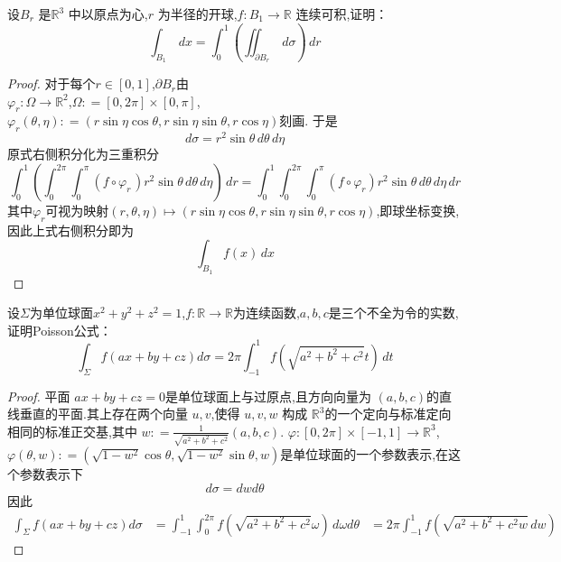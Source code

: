 \documentclass[lang=cn,12pt,color=green,fontset=none,thmcnt=section]{elegantbook}
\begin{document}
\begin{exercise}[]
设\(B_{r} \) 是\(\mathbb{R}^{3}\) 中以原点为心,\(r\) 为半径的开球,\(
    f:B_1 \to \mathbb{R}
\) 连续可积,证明： \[
    \int_{B_1} \,d{x} = \int_{0}^{1}\left( \iint_{\partial{B_{r}}} \,d{\sigma} \right)  \,d{r}
\]

\end{exercise}

\begin{proof}
  对于每个$r \in[0,1]$,$\partial B_{r}$由
  \\ $\varphi _{r}:\Omega\to
   \mathbb{R}^{2}$,$\Omega: =[0,2\pi]\times\left[ 0, \pi \right]$,$\varphi _{r}
   \left( \theta,\eta \right): = \left( r\sin\eta \cos\theta,r\sin \eta
   \sin\theta,r\cos \eta \right)$刻画. 于是 $$ d\sigma = r^{2}\sin\theta\, d\theta\,
   d \eta $$原式右侧积分化为三重积分 $$ \int _{0}^{1}\left( \int _{0}^{2\pi}\int
   _{0}^{\pi}\left( f\circ \varphi _{r\,} \right)r^{2} \sin\theta \,d\theta \,d
   \eta \right) \,dr = \int _{0}^{1}\int _{0}^{2\pi}\int _{0}^{\pi}\left( f\circ
   \varphi _{r} \right) r^{2}\sin\theta\,d\theta \,d \eta \,dr$$其中$\varphi
   _{r}$可视为映射$\left( r,\theta,\eta \right)\mapsto \left( r\sin \eta \cos\theta,
   r\sin \eta \sin \theta,r\cos \eta \right)$,即球坐标变换,因此上式右侧积分即为 $$ \int
   _{B_{1}}f\left( x \right) \,dx $$

\end{proof}

\begin{exercise}
设$\Sigma$为单位球面$x^{2}+y^{2}+z^{2}=1$,$f:\mathbb{R}\to \mathbb{R}$为连续函数,$a,b,
c$是三个不全为令的实数,证明Poisson公式： $$ \int _{\Sigma}f\left( ax+by+cz \right) d\sigma =
2\pi \int _{-1}^{1}f\left( \sqrt{ a^{2}+b^{2}+c^{2} } t\right) \,dt $$
    
\end{exercise}

\begin{proof}

平面 $ax+ by+ cz= 0 $是单位球面上与过原点,且方向向量为 $\left( a,b,c \right) $的直线垂直的平面.其上存在两个向量 $u ,v$,使得 $u,v,w$ 
构成 $ \mathbb{R}^{3}   $的一个定向与标准定向相同的标准正交基,其中 $ w : = \frac{1}{ \sqrt{ a^{2}+ b^{2}+ c^{2}}}\left( a,b,c \right) $.
$\varphi: [0,2\pi]\times [-1,1]\to \mathbb{R}^{3}$,$\varphi\left( \theta,w \right) : = \left( \sqrt{1-w^{2}} \cos \theta ,\sqrt{1- w^{2}} \sin \theta
 ,w \right)  $是单位球面的一个参数表示,在这个参数表示下 $$
 d \sigma =  dw d\theta 
 $$
 因此 $$
 \begin{aligned}
    \int_{\Sigma} f\left( ax+ by+ cz    \right)d \sigma  & =  \int_{-1}^{1} \int_{0}^{2\pi} f\left(  \sqrt{ a^{2}+ b^{2}+ c^{2}} \omega   \right)\, d\omega d \theta
        & = 2\pi\int_{-1}^{1}f\left( \sqrt{a^{2}+ b^{2}+ c^{2}w}\,dw \right)   
 \end{aligned} 
 $$

\end{proof}
\end{document}
